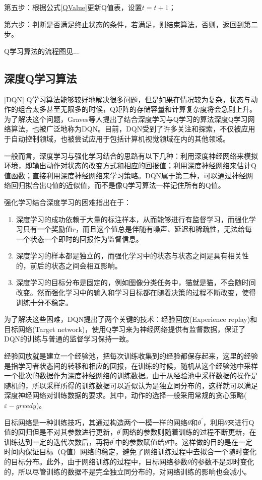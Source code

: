 第五步：根据公式\ref{QValue}更新Q值表，设置$t = t+1$；

第六步：判断是否满足终止状态的条件，若满足，则结束算法，否则，返回到第二步。

Q学习算法的流程图见...

\subsection{深度Q学习算法}[DQN]
Q学习算法能够较好地解决很多问题，但是如果在情况较为复杂，状态与动作的组合太多甚至无限多的时候，Q矩阵的存储容量和计算复杂度将会急剧上升。为了解决这个问题，Graves等人提出了结合深度学习与Q学习的算法深度Q学习网络算法\cite{DQNNature}，也被广泛地称为DQN。目前，DQN受到了许多关注和探索，不仅被应用于自动控制领域，也被尝试应用于包括计算机视觉领域在内的其他领域。

一般而言，深度学习与强化学习结合的思路有以下几种：利用深度神经网络来模拟环境，即输出动作对状态的改变方式和相应的回报值；利用深度神经网络来估计Q值函数；直接利用深度神经网络来学习策略。DQN属于第二种，可以通过神经网络回归拟合出Q值的近似值，而不是像Q学习算法一样记住所有的Q值。

强化学习结合深度学习的困难指出在于：
\begin{enumerate}    
    \item 深度学习的成功依赖于大量的标注样本，从而能够进行有监督学习，而强化学习只有一个奖励值$r$，而且这个值总是伴随有噪声、延迟和稀疏性，无法给每一个状态一个即时的回报作为监督信息。
    \item 深度学习的样本都是独立的，而强化学习中的状态与状态之间是具有相关性的，前后的状态之间会相互影响。
    \item 深度学习的目标分布是固定的，例如图像分类任务中，猫就是猫，不会随时间改变。然而强化学习中的输入和学习目标都在随着决策的过程不断改变，使得训练十分不稳定。
\end{enumerate}

为了解决这些困难，DQN提出了两个关键的技术：经验回放(Experience replay)和目标网络(Target network)，使用Q学习来为神经网络提供有监督数据，保证了DQN的训练与普通的监督学习保持一致。

经验回放就是建立一个经验池，把每次训练收集到的经验都保存起来，这里的经验是指学习者状态间的转移和相应的回报，在训练的时候，随机从这个经验池中采样一个批次的数据作为深度神经网络的训练数据。由于从经验池中采样数据的操作是随机的，所以采样所得的训练数据可以近似认为是独立同分布的，这样就可以满足深度神经网络对训练数据的要求。其中，动作的选择一般采用常规的贪心策略($\varepsilon-greedy$)。

目标网络是一种训练技巧，其通过构造两个一模一样的网络$\theta$和$\theta^{'}$，利用$\theta$来进行Q值的回归但是不对其参数进行更新，$\theta^{'}$网络的参数则随着训练的过程不断更新，在训练达到一定的迭代次数后，再将$\theta^{'}$中的参数赋值给$\theta$中。这样做的目的是在一定时间内保证目标（Q值）网络的稳定，避免了网络训练过程中去拟合一个随时变化的目标分布。此外，由于网络训练的过程中，目标网络参数$\theta$的参数不是即时变化的，所以尽管训练的数据不是完全独立同分布的，对网络训练的影响也会减小。

